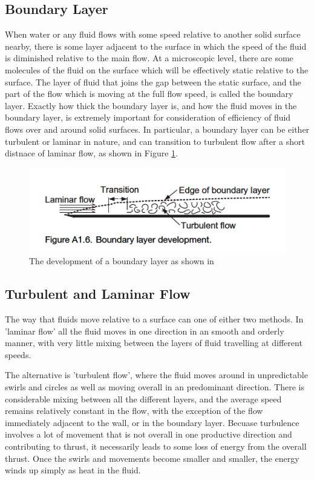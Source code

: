 \documentclass{article}\usepackage[]{graphicx}\usepackage[]{color}
\begin{document}
\subsection{Boundary Layer}
When water or any fluid flows with some speed relative to another solid surface nearby, there is some layer adjacent to the surface in which the speed of the fluid is diminished relative to the main flow.  At a microscopic level, there are some molecules of the fluid on the surface which will be effectively static relative to the surface.  The layer of fluid that joins the gap between the static surface, and the part of the flow which is moving at the full flow speed, is called the boundary layer.  Exactly how thick the boundary layer is, and how the fluid moves in the boundary layer, is extremely important for consideration of efficiency of fluid flows over and around solid surfaces.  In particular, a boundary layer can be either turbulent or laminar in nature, and can transition to turbulent flow after a short distnace of laminar flow, as shown in Figure \ref{fig:BoundaryLayer.png}.


\begin{figure}
\includegraphics[width=\textwidth]{BoundaryLayer.png}
\caption{The development of a boundary layer as shown in \parencite{mollard2011}}
\label{fig:BoundaryLayer.png}
\end{figure}

\subsection{Turbulent and Laminar Flow}
The way that fluids move relative to a surface can one of either two methods.  In 'laminar flow' all the fluid moves in one direction in an smooth and orderly manner, with very little mixing between the layers of fluid travelling at different speeds.

The alternative is 'turbulent flow', where the fluid moves around in unpredictable swirls and circles as well as moving overall in an predominant direction.  There is considerable mixing between all the different layers, and the average speed remains relatively constant in the flow, with the exception of the flow immediately adjacent to the wall, or in the boundary layer.  Becuase turbulence involves a lot of movement that is not overall in one productive direction and contributing to thrust, it necessarily leads to some loss of energy from the overall thrust.  Once the swirls and movements become smaller and smaller, the energy winds up simply as heat in the fluid.
\end{document}
